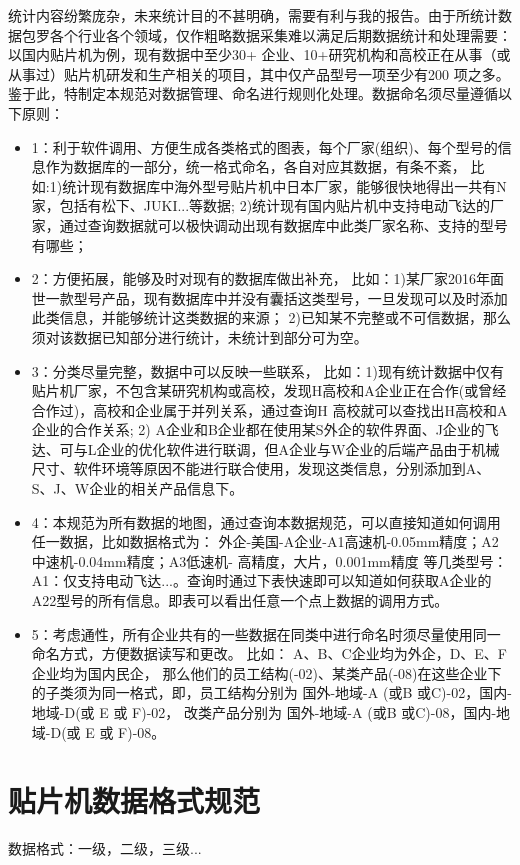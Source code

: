 \documentclass[a4paper,12pt,UTF8]{article}
\begin{document}
统计内容纷繁庞杂，未来统计目的不甚明确，需要有利与我的报告。由于所统计数据包罗各个行业各个领域，仅作粗略数据采集难以满足后期数据统计和处理需要： 以国内贴片机为例，现有数据中至少30+ 企业、10+研究机构和高校正在从事（或从事过）贴片机研发和生产相关的项目，其中仅产品型号一项至少有200 项之多。鉴于此，特制定本规范对数据管理、命名进行规则化处理。数据命名须尽量遵循以下原则：
\begin{itemize}
  \item 1：利于软件调用、方便生成各类格式的图表，每个厂家(组织)、每个型号的信息作为数据库的一部分，统一格式命名，各自对应其数据，有条不紊，
       比如:1)统计现有数据库中海外型号贴片机中日本厂家，能够很快地得出一共有N家，包括有松下、JUKI...等数据; 2)统计现有国内贴片机中支持电动飞达的厂家，通过查询数据就可以极快调动出现有数据库中此类厂家名称、支持的型号有哪些；
  \item 2：方便拓展，能够及时对现有的数据库做出补充，
        比如：1)某厂家2016年面世一款型号产品，现有数据库中并没有囊括这类型号，一旦发现可以及时添加此类信息，并能够统计这类数据的来源； 2)已知某不完整或不可信数据，那么须对该数据已知部分进行统计，未统计到部分可为空。
  \item 3：分类尽量完整，数据中可以反映一些联系，
        比如：1)现有统计数据中仅有贴片机厂家，不包含某研究机构或高校，发现H高校和A企业正在合作(或曾经合作过)，高校和企业属于并列关系，通过查询H 高校就可以查找出H高校和A企业的合作关系; 2) A企业和B企业都在使用某S外企的软件界面、J企业的飞达、可与L企业的优化软件进行联调，但A企业与W企业的后端产品由于机械尺寸、软件环境等原因不能进行联合使用，发现这类信息，分别添加到A、S、J、W企业的相关产品信息下。
  \item 4：本规范为所有数据的地图，通过查询本数据规范，可以直接知道如何调用任一数据，比如数据格式为： 外企-美国-A企业-A1高速机-0.05mm精度；A2中速机-0.04mm精度；A3低速机- 高精度，大片，0.001mm精度 等几类型号：A1：仅支持电动飞达...。查询时通过下表快速即可以知道如何获取A企业的A22型号的所有信息。即表可以看出任意一个点上数据的调用方式。
  \item 5：考虑通性，所有企业共有的一些数据在同类中进行命名时须尽量使用同一命名方式，方便数据读写和更改。 比如： A、B、C企业均为外企，D、E、F企业均为国内民企， 那么他们的员工结构(-02)、某类产品(-08)在这些企业下的子类须为同一格式，即，员工结构分别为 国外-地域-A (或B 或C)-02，国内-地域-D(或 E 或 F)-02， 改类产品分别为 国外-地域-A (或B 或C)-08，国内-地域-D(或 E 或 F)-08。
\end{itemize}



\section{贴片机数据格式规范}
数据格式：一级，二级，三级...
\end{document}
